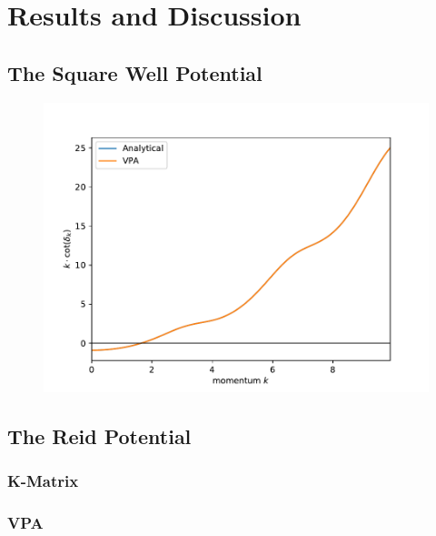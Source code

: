 \section{Results and Discussion}\label{sec:Results}

\subsection{The Square Well Potential}


\begin{figure}[ht]
  \centering
  \includegraphics[]{Figures/analytical_cot.pdf}
  \caption{\label{fig:label} }
\end{figure}

\subsection{The Reid Potential}
\subsubsection{K-Matrix}
\subsubsection{VPA}




